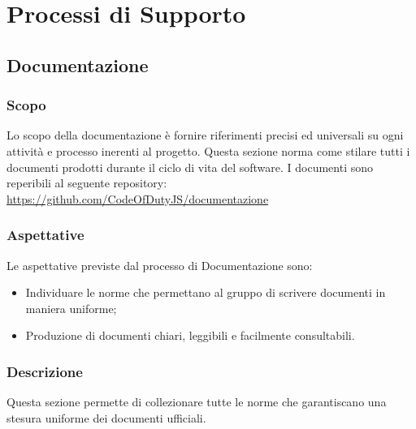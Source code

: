 \section{Processi di Supporto}
	\subsection{Documentazione}
	    
	    \subsubsection{Scopo}
	    Lo scopo della documentazione è fornire riferimenti precisi ed universali su ogni attività e processo inerenti al progetto. Questa sezione norma come stilare tutti i documenti prodotti durante il ciclo di vita del software. I documenti sono reperibili al seguente repository:
	    \url{https://github.com/CodeOfDutyJS/documentazione}
	    
	    \subsubsection{Aspettative}
	    Le aspettative previste dal processo di Documentazione sono:
	    \begin{itemize}
	    	\item Individuare le norme che permettano al gruppo di scrivere documenti in maniera uniforme;
	    	\item Produzione di documenti chiari, leggibili e facilmente consultabili.
	    \end{itemize}
	    
	    \subsubsection{Descrizione}
	    Questa sezione permette di collezionare tutte le norme che garantiscano una stesura uniforme dei documenti ufficiali.
	    

